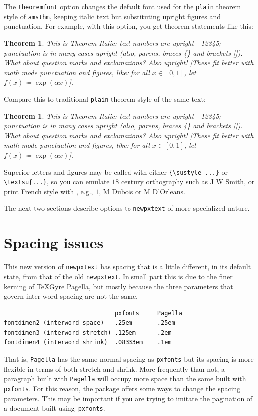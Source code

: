 \documentclass[11pt]{article}
\theoremstyle{oldplain}
\newtheorem{oldthm}{Theorem}[section]
\theoremstyle{plain}
\newtheorem{thm}{Theorem}[section]
\begin{document}
The {\tt theoremfont} option changes the default font used for the {\tt plain} theorem style of {\tt amsthm}, keeping italic text but substituting upright figures and punctuation. For example, with this option, you get theorem statements like this:

\begin{thm}
This is Theorem Italic: text numbers are upright---12345; punctuation is in many cases upright (also, parens, braces \{\} and brackets []). What about question marks and exclamations? Also upright! [These fit better with math mode punctuation and figures, like: for all $x\in[0,1]$, let $f(x)\coloneq \exp(\alpha x)$].
\end{thm}
Compare this to traditional {\tt plain} theorem style of the same text:
\begin{oldthm}
This is Theorem Italic: text numbers are upright---12345; punctuation is in many cases upright (also, parens, braces \{\} and brackets []). What about question marks and exclamations? Also upright! [These fit better with math mode punctuation and figures, like: for all $x\in[0,1]$, let $f(x)\coloneq \exp(\alpha x)$].
\end{oldthm}


Superior letters and figures may be called with either \verb|{\sustyle ...}| or \verb|\textsu{...}|, so you can emulate $18$ century orthography such as J W Smith, or print French style with , e.g., $1$, M Dubois or M D'Orleans.

The next two sections describe options to {\tt newpxtext} of more specialized nature.

\section{Spacing issues}
This new version of {\tt newpxtext} has spacing that is a little different, in its default state, from that of the old {\tt newpxtext}. In small part this is due to the finer kerning of TeXGyre Pagella, but mostly because the three parameters that govern inter-word spacing are not the same.
\begin{verbatim}
                               pxfonts     Pagella
fontdimen2 (interword space)   .25em       .25em
fontdimen3 (interword stretch) .125em      .2em
fontdimen4 (interword shrink)  .08333em    .1em
\end{verbatim}
That is, {\tt Pagella} has the same normal spacing as {\tt pxfonts} but its spacing is more flexible in terms of both stretch and shrink. More frequently than not, a paragraph built with {\tt Pagella} will occupy more space than the same built with {\tt pxfonts}. For this reason, the package offers some ways to change the spacing parameters. This may be important if you are trying to imitate the pagination of a document built using~{\tt pxfonts}.
\end{document}
